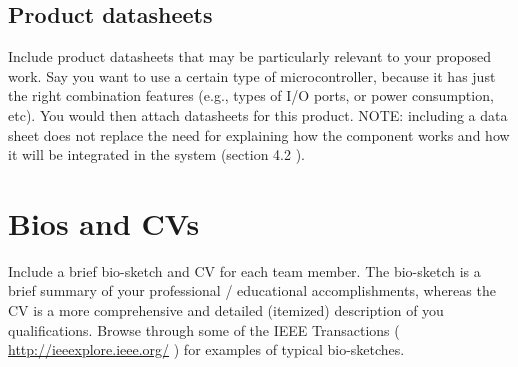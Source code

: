 \documentclass[letterpaper,12pt]{article}
\begin{document}
\subsection{Product datasheets}
Include product datasheets that may be particularly relevant to your
proposed work. Say you want to use a certain type of microcontroller,
because it has just the right combination features (e.g., types of I/O
ports, or power consumption, etc). You would then attach datasheets for
this product.  NOTE: including a data sheet does not replace the need
for explaining how the component works and how it will be integrated in
the system (section 4.2 ).

\section{Bios and CVs}
Include a brief bio-sketch and CV for each team member. The bio-sketch
is a brief summary of your professional / educational accomplishments,
whereas the CV is a more comprehensive and detailed (itemized) description
of you qualifications. Browse through some of the IEEE Transactions (
\url{http://ieeexplore.ieee.org/} ) for examples of typical bio-sketches.
\end{document}
